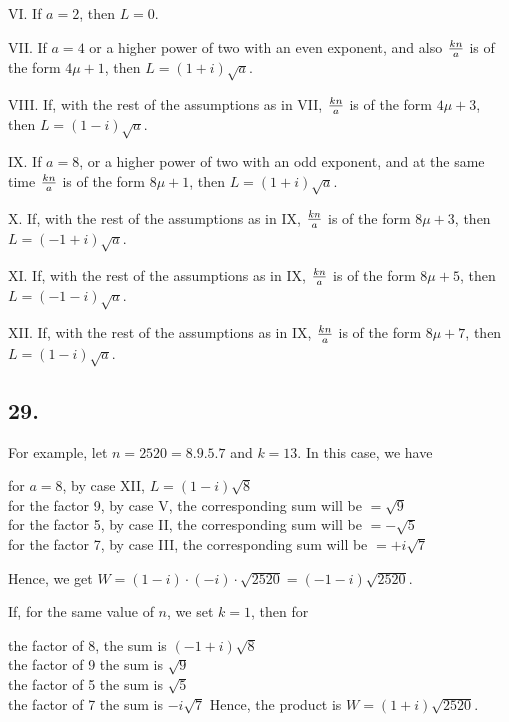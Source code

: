 \documentclass[twoside,12pt]{memoir}
\renewenvironment{quote}%
  {\list{}{\leftmargin=5em\rightmargin=0em}\item[]}%
  {\endlist}
\let\oldfrac\frac
\def\frac#1#2{\mathchoice{\tfrac{#1}{#2}}{\oldfrac{#1}{#2}}{\genfrac{}{}{}{2}{#1}{#2\mathstrut}}{\genfrac{}{}{}{3}{#1}{#2\mathstrut}}}
\begin{document}
VI. If \(a=2\), then \(L=0\).

VII. If \(a=4\) or a higher power of two with an even exponent, and also \(\frac{k n}{a}\) is of the form \(4 \mu+1\), then \(L=(1+i) \sqrt{a}\).

VIII. If, with the rest of the assumptions as in VII, \(\frac{k n}{a}\) is of the form \(4 \mu+3\), then \(L=(1-i) \sqrt{a}\).

IX. If \(a=8\), or a higher power of two with an odd exponent, and at the same time \(\frac{k n}{a}\) is of the form \(8 \mu+1\), then \(L=(1+i) \sqrt{a}\).\pagebreak%

X. If, with the rest of the assumptions as in IX, \(\frac{k n}{a}\) is of the form \(8 \mu+3\), then \(L=(-1+i) \sqrt{a}\).

XI. If, with the rest of the assumptions as in IX, \(\frac{k n}{a}\) is of the form \(8 \mu+5\), then \(L=(-1-i) \sqrt{a}\).

XII. If, with the rest of the assumptions as in IX, \(\frac{k n}{a}\) is of the form \(8 \mu+7\), then \(L=(1-i) \sqrt{a}\).

\subsection*{29.}

For example, let \(n=2520=8 . 9 . 5 . 7\) and \(k=13\). In this case, we have
\begin{quote}
for \(a=8\), by case XII, \(L=(1-i) \sqrt{8}\)\\
for the factor 9, by case V, the corresponding sum will be \(=\sqrt{9}\)\\
for the factor 5, by case II, the corresponding sum will be \(=-\sqrt{5}\)\\
for the factor 7, by case III, the corresponding sum will be \(=+i \sqrt{7}\)
\end{quote}

Hence, we get \(W=(1-i) \cdot(-i) \cdot \sqrt{2520}=(-1-i) \sqrt{2520}\).

If, for the same value of \(n \), we set \(k = 1 \), then for
\begin{quote}
the factor of 8, the sum is \((-1+i) \sqrt{8}\)\\
the factor of 9 the sum is \(\sqrt{9}\)\\
the factor of 5 the sum is \(\sqrt{5}\)\\
the factor of 7 the sum is \(-i \sqrt{7}\)
\end{quote}
Hence, the product is \(W = (1+i) \sqrt{2520}\).
\end{document}
